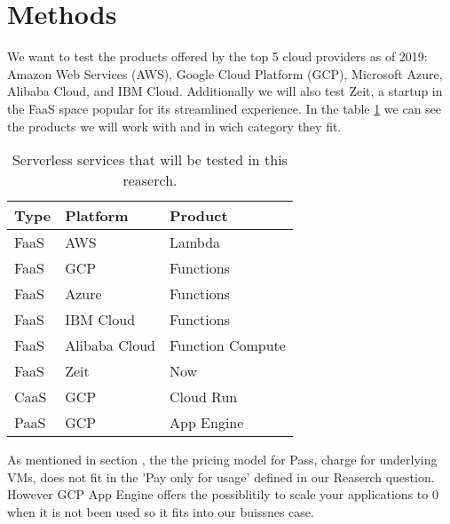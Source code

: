 \documentclass[11pt]{article}
\begin{document}





\section{Methods}
\label{methods}
We want to test the products offered by the top 5 cloud providers as of 2019: Amazon Web Services (AWS), Google Cloud Platform (GCP), Microsoft Azure, Alibaba Cloud, and IBM Cloud. Additionally we will also test Zeit, a startup in the FaaS space popular for its streamlined experience. In the table \ref{Tab:services} we can see the products we will work with and in wich category they fit. \\


\begin{table}
\centering
 \begin{tabularx}{\textwidth}{ X  X  X }
 \textbf{Type} & \textbf{Platform} & \textbf{Product} \\
 \hline
 \hline
 FaaS & AWS & Lambda \\
 \hline
 FaaS & GCP & Functions \\
 \hline
 FaaS & Azure & Functions \\
 \hline
 FaaS & IBM Cloud & Functions \\
 \hline
 FaaS & Alibaba Cloud & Function Compute \\
 \hline
 FaaS & Zeit & Now \\
 \hline
 CaaS & GCP & Cloud Run \\
 \hline
 PaaS & GCP & App Engine \\

\end{tabularx}
\caption{Serverless services that will be tested in this reaserch.}
\label{Tab:services}
\end{table}

As mentioned in section \label{introduction}, the the pricing model for Pass, charge for underlying VMs, does not fit in the 'Pay only for usage' defined in our Reaserch question. However GCP App Engine offers the possiblitily to scale your applications to 0 when it is not been used so it fits into our buissnes case.
\end{document}
